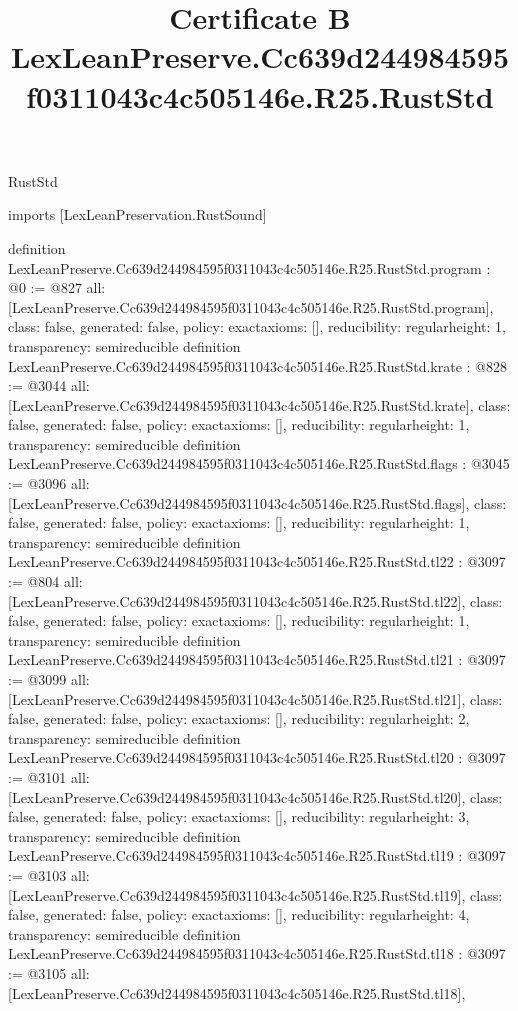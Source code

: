 \begin{lexlean}{RustStd}
\title{Certificate B LexLeanPreserve.Cc639d244984595f0311043c4c505146e.R25.RustStd}
\begin{coremodule}
imports [LexLeanPreservation.RustSound]

definition LexLeanPreserve.Cc639d244984595f0311043c4c505146e.R25.RustStd.program : @0 := @827 {
  all: [LexLeanPreserve.Cc639d244984595f0311043c4c505146e.R25.RustStd.program],
  class: false,
  generated: false,
  policy: exact{axioms: []},
  reducibility: regular{height: 1},
  transparency: semireducible
}
definition LexLeanPreserve.Cc639d244984595f0311043c4c505146e.R25.RustStd.krate : @828 := @3044 {
  all: [LexLeanPreserve.Cc639d244984595f0311043c4c505146e.R25.RustStd.krate],
  class: false,
  generated: false,
  policy: exact{axioms: []},
  reducibility: regular{height: 1},
  transparency: semireducible
}
definition LexLeanPreserve.Cc639d244984595f0311043c4c505146e.R25.RustStd.flags : @3045 := @3096 {
  all: [LexLeanPreserve.Cc639d244984595f0311043c4c505146e.R25.RustStd.flags],
  class: false,
  generated: false,
  policy: exact{axioms: []},
  reducibility: regular{height: 1},
  transparency: semireducible
}
definition LexLeanPreserve.Cc639d244984595f0311043c4c505146e.R25.RustStd.tl22 : @3097 := @804 {
  all: [LexLeanPreserve.Cc639d244984595f0311043c4c505146e.R25.RustStd.tl22],
  class: false,
  generated: false,
  policy: exact{axioms: []},
  reducibility: regular{height: 1},
  transparency: semireducible
}
definition LexLeanPreserve.Cc639d244984595f0311043c4c505146e.R25.RustStd.tl21 : @3097 := @3099 {
  all: [LexLeanPreserve.Cc639d244984595f0311043c4c505146e.R25.RustStd.tl21],
  class: false,
  generated: false,
  policy: exact{axioms: []},
  reducibility: regular{height: 2},
  transparency: semireducible
}
definition LexLeanPreserve.Cc639d244984595f0311043c4c505146e.R25.RustStd.tl20 : @3097 := @3101 {
  all: [LexLeanPreserve.Cc639d244984595f0311043c4c505146e.R25.RustStd.tl20],
  class: false,
  generated: false,
  policy: exact{axioms: []},
  reducibility: regular{height: 3},
  transparency: semireducible
}
definition LexLeanPreserve.Cc639d244984595f0311043c4c505146e.R25.RustStd.tl19 : @3097 := @3103 {
  all: [LexLeanPreserve.Cc639d244984595f0311043c4c505146e.R25.RustStd.tl19],
  class: false,
  generated: false,
  policy: exact{axioms: []},
  reducibility: regular{height: 4},
  transparency: semireducible
}
definition LexLeanPreserve.Cc639d244984595f0311043c4c505146e.R25.RustStd.tl18 : @3097 := @3105 {
  all: [LexLeanPreserve.Cc639d244984595f0311043c4c505146e.R25.RustStd.tl18],
}
\end{coremodule}
\end{lexlean}
